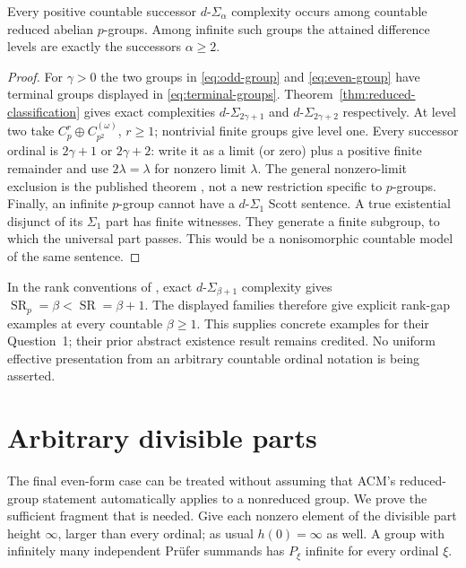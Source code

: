 \documentclass[11pt]{article}
\begin{document}
\begin{theorem}\label{thm:difference-spectrum}
Every positive countable successor $d\text{-}\Sigma_\alpha$ complexity
occurs among countable reduced abelian $p$-groups. Among infinite such
groups the attained difference levels are exactly the successors
$\alpha\geq2$.
\end{theorem}
\begin{proof}
For $\gamma>0$ the two groups in \eqref{eq:odd-group} and
\eqref{eq:even-group} have terminal groups displayed in
\eqref{eq:terminal-groups}. Theorem~\ref{thm:reduced-classification} gives
exact complexities $d\text{-}\Sigma_{2\gamma+1}$ and
$d\text{-}\Sigma_{2\gamma+2}$ respectively. At level two take
$C_p^r\oplus C_{p^2}^{(\omega)}$, $r\geq1$; nontrivial finite groups
give level one. Every successor ordinal is $2\gamma+1$ or $2\gamma+2$:
write it as a limit (or zero) plus a positive finite remainder and use
$2\lambda=\lambda$ for nonzero limit $\lambda$.
The general nonzero-limit exclusion is the published theorem
\cite[Theorems~1.6 and 2.6]{AGHT}, not a new restriction specific to
$p$-groups.
Finally, an infinite $p$-group cannot have a $d\text{-}\Sigma_1$ Scott
sentence. A true existential disjunct of its $\Sigma_1$ part has finite
witnesses. They generate a finite subgroup, to which the universal
part passes. This would be a nonisomorphic countable model of the same
sentence.
\end{proof}

In the rank conventions of \cite{GRT}, exact
$d\text{-}\Sigma_{\beta+1}$ complexity gives
$\operatorname{SR}_p=\beta<\operatorname{SR}=\beta+1$.
The displayed families therefore give explicit rank-gap examples at
every countable $\beta\geq1$. This supplies concrete examples for their
Question~1; their prior abstract existence result remains credited.
No uniform effective presentation from an arbitrary countable ordinal
notation is being asserted.

\section{Arbitrary divisible parts}
\label{sec:infinite-divisible}

The final even-form case can be treated without assuming that ACM's
reduced-group statement automatically applies to a nonreduced group.
We prove the sufficient fragment that is needed. Give each nonzero
element of the divisible part height $\infty$, larger than every ordinal;
as usual $h(0)=\infty$ as well. A group with infinitely many independent
Pr\"ufer summands has $P_\xi$ infinite for every ordinal $\xi$.
\end{document}
